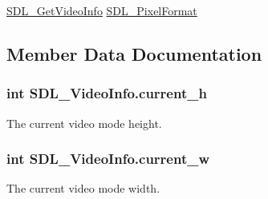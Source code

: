 \hyperlink{_sdl_8cs_a016732fde2f5c8a5bf71953cc8cba10f}{SDL\_\-GetVideoInfo} \hyperlink{struct_s_d_l___pixel_format}{SDL\_\-PixelFormat} 

\subsection{Member Data Documentation}
\hypertarget{struct_s_d_l___video_info_a9c9088f016548b23957dffa7613ac8de}{
\subsubsection[{current\_\-h}]{\setlength{\rightskip}{0pt plus 5cm}int {\bf SDL\_\-VideoInfo.current\_\-h}}}
\label{struct_s_d_l___video_info_a9c9088f016548b23957dffa7613ac8de}


The current video mode height. 

\hypertarget{struct_s_d_l___video_info_ad56534a96546b338a2a80f16ef827a8b}{
\subsubsection[{current\_\-w}]{\setlength{\rightskip}{0pt plus 5cm}int {\bf SDL\_\-VideoInfo.current\_\-w}}}
\label{struct_s_d_l___video_info_ad56534a96546b338a2a80f16ef827a8b}


The current video mode width. 

